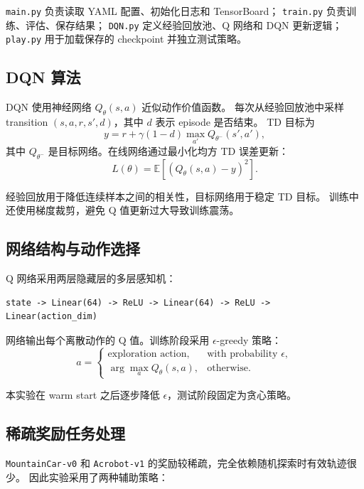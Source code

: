 \documentclass[UTF8,a4paper,12pt]{ctexart}
\begin{document}
\texttt{main.py} 负责读取 YAML 配置、初始化日志和 TensorBoard；
\texttt{train.py} 负责训练、评估、保存结果；
\texttt{DQN.py} 定义经验回放池、Q 网络和 DQN 更新逻辑；
\texttt{play.py} 用于加载保存的 checkpoint 并独立测试策略。

\subsection{DQN 算法}

DQN 使用神经网络 $Q_\theta(s,a)$ 近似动作价值函数。
每次从经验回放池中采样 transition $(s,a,r,s',d)$，其中 $d$ 表示 episode 是否结束。
TD 目标为
\begin{equation}
    y = r + \gamma(1-d)\max_{a'}Q_{\theta^-}(s',a'),
\end{equation}
其中 $Q_{\theta^-}$ 是目标网络。在线网络通过最小化均方 TD 误差更新：
\begin{equation}
    L(\theta)=\mathbb{E}\left[(Q_\theta(s,a)-y)^2\right].
\end{equation}

经验回放用于降低连续样本之间的相关性，目标网络用于稳定 TD 目标。
训练中还使用梯度裁剪，避免 Q 值更新过大导致训练震荡。

\subsection{网络结构与动作选择}

Q 网络采用两层隐藏层的多层感知机：
\begin{verbatim}
state -> Linear(64) -> ReLU -> Linear(64) -> ReLU -> Linear(action_dim)
\end{verbatim}

网络输出每个离散动作的 Q 值。训练阶段采用 $\epsilon$-greedy 策略：
\begin{equation}
    a =
    \begin{cases}
    \text{exploration action}, & \text{with probability } \epsilon,\\
    \arg\max_a Q_\theta(s,a), & \text{otherwise}.
    \end{cases}
\end{equation}

本实验在 warm start 之后逐步降低 $\epsilon$，测试阶段固定为贪心策略。

\subsection{稀疏奖励任务处理}

\texttt{MountainCar-v0} 和 \texttt{Acrobot-v1} 的奖励较稀疏，完全依赖随机探索时有效轨迹很少。
因此实验采用了两种辅助策略：
\end{document}
